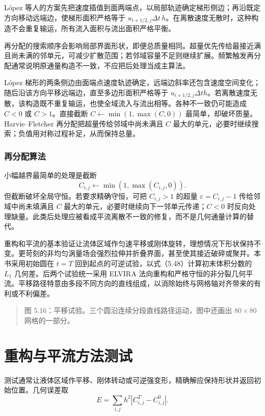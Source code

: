\documentclass[11pt,a4paper,openany,fontset=none]{ctexbook}
\begin{document}
L\'opez 等人的方案先把速度插值到面两端点，以局部轨迹确定梯形侧边；再沿既定方向移动远端边，使梯形面积严格等于 $u_{i+1/2,j}\Delta t\,h$。在离散速度无散时，这种构造不会重复输运，所有流入面积与流出面积严格平衡。

再分配的搜索顺序会影响局部界面形状，即便总质量相同。超量优先传给最接近满且尚未满的邻单元，可减少扩散范围；若邻域容量不足则继续扩展。频繁触发再分配通常说明原通量构造不一致，不应把后处理当成主算法。

López 梯形的两条侧边由面端点速度轨迹确定，远端边斜率还包含速度空间变化；随后沿该方向平移远端边，直至多边形面积严格等于 $u_{i+1/2,j}\Delta t h$。若离散速度无散，该构造既不重复输运，也使全域流入与流出相等。各种不一致仍可能造成 $C<0$ 或 $C>1$。直接截断 $C\leftarrow\min(1,\max(C,0))$ 最简单，却破坏质量。Harvie--Fletcher 再分配把超量传给邻域中尚未满且 $C$ 最大的单元，必要时继续搜索；负值用对称过程补足，从而保持总量。

\subsubsection{再分配算法}

小幅越界最简单的处理是截断
\begin{equation}
C_{i,j}\leftarrow\min(1,\max(C_{i,j},0)).
\end{equation}
但截断破坏全局守恒。若要求精确守恒，可把 $C_{i,j}>1$ 的超量 $\varepsilon=C_{i,j}-1$ 传给邻域中尚未填满且 $C$ 最大的单元，必要时继续向下一邻单元传递；$C<0$ 时反向处理缺量。此类后处理应被看成平流离散不一致的修复，而不是几何通量计算的替代。

重构和平流的基本验证让流体区域作匀速平移或刚体旋转，理想情况下形状保持不变。更苛刻的非均匀涡量场会强烈拉伸并折叠界面，甚至使其接近破碎或聚并。本书采用初始圆在 $t=T$ 回到起点的可逆试验，以式（5.48）计算初末体积分数的 $L_1$ 几何差。后两个试验统一采用 ELVIRA 法向重构和严格守恒的非分裂几何平流。平移路径特意由多段不同方向的直线组成，以消除始终与网格轴对齐带来的有利或不利偏差。

\begin{quote}\small 图 5.16：平移试验。三个圆沿连续分段直线路径运动，图中还画出 $80\times80$ 网格的一部分。\end{quote}
\section{重构与平流方法测试}

测试通常让液体区域作平移、刚体转动或可逆强变形，精确解应保持形状并返回初始位置。几何误差取
\begin{equation}
E=\sum_{i,j}h^2|C_{i,j}^{T}-C_{i,j}^{0}|.
\tag{5.48}
\end{equation}
\end{document}
